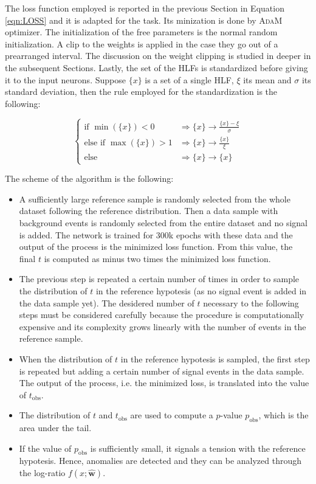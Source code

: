The loss function employed is reported in the previous Section in Equation \ref{eqn:LOSS} and it is adapted for the task. Its minization is done by \textsc{AdaM} optimizer. The initialization of the free parameters is the normal random initialization. A clip to the weights is applied in the case they go out of a prearranged interval. The discussion on the weight clipping is studied in deeper in the subsequent Sections. Lastly, the set of the HLFs is standardized before giving it to the input neurons. Suppose $\{x\}$ is a set of a single HLF, $\xi$ its mean and $\sigma$ its standard deviation, then the rule employed for the standardization is the following:

\begin{equation}
	\begin{cases}
		\text{if } \min{(\{x\})} < 0	&	\Longrightarrow \{x\} \longrightarrow \frac{\{x\} - \xi}{\sigma}	\\
		\text{else if } \max{(\{x\})} > 1	&	\Longrightarrow	\{x\} \longrightarrow \frac{\{x\}}{\xi}	\\
		\text{else }	&	\Longrightarrow	\{x\} \longrightarrow \{x\}
	\end{cases}
\end{equation}

\noindent
The scheme of the algorithm is the following:
\begin{itemize}
	\item A sufficiently large reference sample is randomly selected from the whole dataset following the reference distribution. Then a data sample with background events is randomly selected from the entire dataset and no signal is added. The network is trained for 300k epochs with these data and the output of the process is the minimized loss function. From this value, the final $t$ is computed as minus two times the minimized loss function.
	\item The previous step is repeated a certain number of times in order to sample the distribution of $t$ in the reference hypotesis (as no signal event is added in the data sample yet). The desidered number of $t$ necessary to the following steps must be considered carefully because the procedure is computationally expensive and its complexity grows linearly with the number of events in the reference sample.
	\item When the distribution of $t$ in the reference hypotesis is sampled, the first step is repeated but adding a certain number of signal events in the data sample. The output of the process, i.e. the minimized loss, is translated into the value of $t_\mathrm{obs}$.
	\item The distribution of $t$ and $t_\mathrm{obs}$ are used to compute a $p$-value $p_\mathrm{obs}$, which is the area under the tail.
	\item If the value of $p_\mathrm{obs}$ is sufficiently small, it signals a tension with the reference hypotesis. Hence, anomalies are detected and they can be analyzed through the log-ratio $f(x;\hat{\mathbf{w}})$.
\end{itemize}





